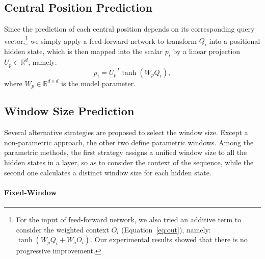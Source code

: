 \documentclass[11pt,a4paper]{article}
\begin{document}
\subsection{\bf Central Position Prediction}

Since the prediction of each central position depends on its corresponding query vector,\footnote{For the input of feed-forward network, we also tried an additive term to consider the weighted context $O_i$ (Equation~\ref{eq:out}), namely: $\tanh (W_p Q_i + W_o O_i)$. Our experimental results showed that there is no progressive improvement.} we simply apply a feed-forward network to transform $Q_i$ into a positional hidden state, which is then mapped into the scalar $p_i$ by a linear projection $U_p\in\mathbb{R}^{d}$, namely: \begin{equation}
  p_i = {U_p}^T \tanh (W_p Q_i),
  \label{eqn:position}
 \end{equation}
where $W_p\in \mathbb{R}^{d \times d}$ is the model parameter. 











\subsection{Window Size Prediction}
\label{sec:window}
\iffalse
\begin{figure*}[t]
    \centering
    \subfigure[Non-Parametric]{
    \texttt{[image: figures/no\_param.pdf]}
    }
    \subfigure[Layer-Specific]{
    \texttt{[image: figures/layer.pdf]}
    }
    \subfigure[Query-Specific]{
    \texttt{[image: figures/query.pdf]}
    } 
\caption{    
\label{fig:models}
Architectures of the proposed models for selecting the local scope.
}
\end{figure*}
\fi
 Several alternative strategies are proposed to select the window size. Except a non-parametric approach, the other two define parametric windows. Among the parametric methods, the first strategy assigns a unified window size to all the hidden states in a layer, so as to consider the context of the sequence, while the second one calculates a distinct window size for each hidden state.
\paragraph{\bf Fixed-Window} 
\end{document}
